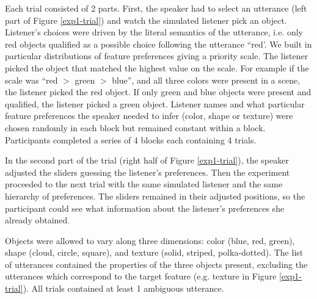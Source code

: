 \documentclass[10pt,a4paper]{article}
\begin{document}
Each trial consisted of 2 parts. 
First, the speaker had to select an utterance (left part of Figure \ref{exp1-trial}) and watch the simulated listener pick an object. Listener's choices were driven by the literal semantics of the utterance, i.e. only red objects qualified as a possible choice following the utterance ``red'. We built in particular distributions of feature preferences giving a priority scale. The listener picked the object that matched the highest value on the scale. For example if the scale was ``red $>$ green $>$ blue'', and all three colors were present in a scene, the listener picked the red object. If only green and blue objects were present and qualified, the listener picked a green object. Listener names and what particular feature preferences the speaker needed to infer (color, shape or texture) were chosen randomly in each block but remained constant within a block. Participants completed a series of 4 blocks each containing 4 trials. 

In the second part of the trial (right half of Figure \ref{exp1-trial}), the speaker adjusted the sliders guessing the listener's preferences. Then the experiment proceeded to the next trial with the same simulated listener and the same hierarchy of preferences. The sliders remained in their adjusted positions, so the participant could see what information about the listener's preferences she already obtained.

Objects were allowed to vary along three dimensions: color (blue, red, green), shape (cloud, circle, square), and texture (solid, striped, polka-dotted). The list of utterances contained the properties of the three objects present, excluding the utterances which correspond to the target feature (e.g. texture in Figure \ref{exp1-trial}).  All trials contained at least 1 ambiguous utterance. 
\end{document}
